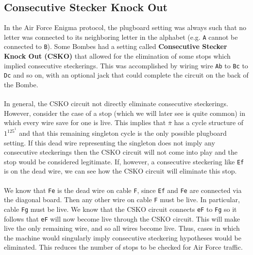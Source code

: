 \subsection{Consecutive Stecker Knock Out}
In the Air Force Enigma protocol, the plugboard setting was always
such that no letter was connected to its neighboring letter in the
alphabet (e.g. \texttt{A} cannot be connected to \texttt{B}). Some
Bombes had a setting called {\bf{Consecutive Stecker Knock Out
(CSKO)}} that allowed for the elimination of some stops which implied
consecutive steckerings. This was accomplished by wiring wire
\texttt{Ab} to \texttt{Bc} to \texttt{Dc} and so on, with an optional
jack that could complete the circuit on the back of the Bombe.
\\\\In general, the CSKO circuit not directly eliminate consecutive
steckerings. However, consider the case of a stop (which we will
later see is quite common) in which every wire save for one is live.
This implies that $\overline\pi$ has a cycle structure of $1^125^1$
and that this remaining singleton cycle is the only possible
plugboard setting. If this dead wire representing the singleton does
not imply any consecutive steckerings then the CSKO circuit will not
come into play and the stop would be considered legitimate. If,
however, a consecutive steckering like \texttt{Ef} is on the dead
wire, we can see how the CSKO circuit will eliminate this stop.
\\\\We know that \texttt{Fe} is the dead wire on cable \texttt{F},
since \texttt{Ef} and \texttt{Fe} are connected via the diagonal
board. Then any other wire on cable \texttt{F} must be live. In
particular, cable \texttt{Fg} must be live. We know that the CSKO
circuit connects \texttt{eF} to \texttt{Fg} so it follows that
\texttt{eF} will now become live through the CSKO circuit. This will
make live the only remaining wire, and so all wires become live. Thus,
cases in which the machine would singularly imply consecutive
steckering hypotheses would be eliminated. This reduces
the number of stops to be checked for Air Force traffic.

